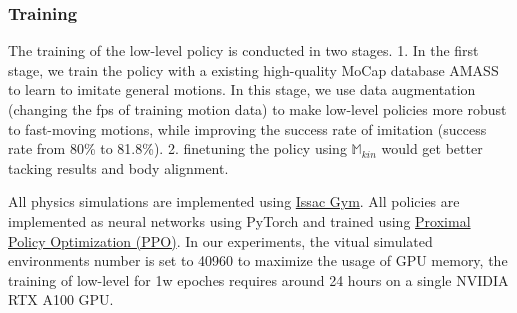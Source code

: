 \documentclass{article}
\begin{document}







\subsubsection{Training}\label{training}

The training of the low-level policy is conducted in two stages. 1. In the first stage, we train the policy with a existing high-quality MoCap database AMASS to learn to imitate general motions. In this stage, we use data augmentation (changing the fps of training motion data) to make low-level policies more robust to fast-moving motions, while improving the success rate of imitation (success rate from 80\% to 81.8\%). 2. finetuning the policy using $\mathbb{M}_{kin}$ would get better tacking results and body alignment.

All physics simulations are implemented using \href{https://developer.nvidia.com/isaac-gym}{Issac Gym}. All policies are implemented as neural networks using PyTorch and trained using \href{https://arxiv.org/pdf/1707.06347}{Proximal Policy Optimization (PPO)}. In our experiments, the vitual simulated environments number is set to 40960 to maximize the usage of GPU memory, the training of low-level for 1w epoches requires around 24 hours on a single NVIDIA RTX A100 GPU.
\end{document}
